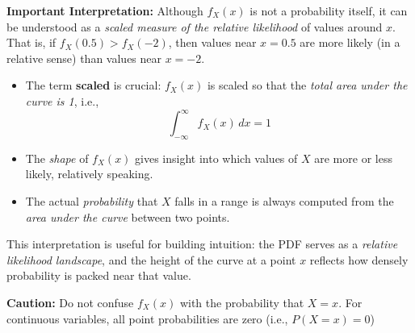 \documentclass[12pt]{article}
\begin{document}
\noindent
\textbf{Important Interpretation:} Although $f_X(x)$ is not a probability itself, it can be understood as a \textit{scaled measure of the relative likelihood} of values around $x$. That is, if $f_X(0.5) > f_X(-2)$, then values near $x = 0.5$ are more likely (in a relative sense) than values near $x = -2$.

\begin{itemize}
    \item The term \textbf{scaled} is crucial: $f_X(x)$ is scaled so that the \emph{total area under the curve is 1}, i.e.,
    \[
    \int_{-\infty}^\infty f_X(x) \, dx = 1
    \]
    \item The \emph{shape} of $f_X(x)$ gives insight into which values of $X$ are more or less likely, relatively speaking.
    \item The actual \emph{probability} that $X$ falls in a range is always computed from the \emph{area under the curve} between two points.
\end{itemize}

\bigskip

\noindent
This interpretation is useful for building intuition: the PDF serves as a \textit{relative likelihood landscape}, and the height of the curve at a point $x$ reflects how densely probability is packed near that value.

\bigskip

\noindent
\textbf{Caution:} Do not confuse $f_X(x)$ with the probability that $X = x$. For continuous variables, all point probabilities are zero (i.e., $P(X = x) = 0$)
\end{document}
